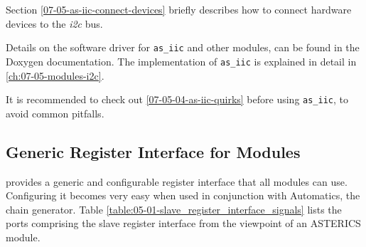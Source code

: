 Section \ref{07-05-as-iic-connect-devices} briefly describes how to connect hardware devices to the \textit{i2c} bus. 

Details on the software driver for \texttt{as\_iic} and other modules, can be found in the \asterics Doxygen documentation.
The implementation of \texttt{as\_iic} is explained in detail in \ref{ch:07-05-modules-i2c}.

It is recommended to check out \ref{07-05-04-as-iic-quirks} before using \texttt{as\_iic}, to avoid common pitfalls.


\subsection{Generic Register Interface for \asterics Modules}
\label{sec:05-01-05-register_interface}

\asterics provides a generic and configurable register interface that all modules can use.
Configuring it becomes very easy when used in conjunction with Automatics, the \asterics chain generator.
Table \ref{table:05-01-slave_register_interface_signals} lists the ports comprising the slave register interface from the viewpoint of an ASTERICS module.

